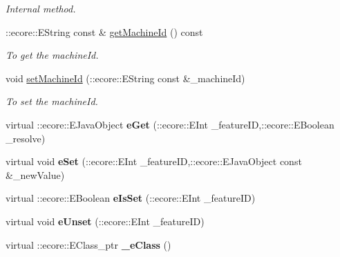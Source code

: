 \begin{DoxyCompactItemize}
\begin{DoxyCompactList}\small\item\em Internal method. \item\end{DoxyCompactList}\item 
::ecore::EString const \& \hyperlink{classIMS__Data_1_1SysInfoOp_aa991816c73b4fbffe99489ba8f5d7d8b}{getMachineId} () const 
\begin{DoxyCompactList}\small\item\em To get the machineId. \item\end{DoxyCompactList}\item 
void \hyperlink{classIMS__Data_1_1SysInfoOp_ab054bec834cea4b57eef465e190f3274}{setMachineId} (::ecore::EString const \&\_\-machineId)
\begin{DoxyCompactList}\small\item\em To set the machineId. \item\end{DoxyCompactList}\item 
\hypertarget{classIMS__Data_1_1SysInfoOp_a2e04f7fb0f37f65d2b4fd9b9a34769d4}{
virtual ::ecore::EJavaObject {\bfseries eGet} (::ecore::EInt \_\-featureID,::ecore::EBoolean \_\-resolve)}
\label{classIMS__Data_1_1SysInfoOp_a2e04f7fb0f37f65d2b4fd9b9a34769d4}

\item 
\hypertarget{classIMS__Data_1_1SysInfoOp_ac2531d0434f45c4c7d58816a30035633}{
virtual void {\bfseries eSet} (::ecore::EInt \_\-featureID,::ecore::EJavaObject const \&\_\-newValue)}
\label{classIMS__Data_1_1SysInfoOp_ac2531d0434f45c4c7d58816a30035633}

\item 
\hypertarget{classIMS__Data_1_1SysInfoOp_af50b867d5d835f1466bc49092165682c}{
virtual ::ecore::EBoolean {\bfseries eIsSet} (::ecore::EInt \_\-featureID)}
\label{classIMS__Data_1_1SysInfoOp_af50b867d5d835f1466bc49092165682c}

\item 
\hypertarget{classIMS__Data_1_1SysInfoOp_a42a9e473c302f1472c1788fa0b8bada2}{
virtual void {\bfseries eUnset} (::ecore::EInt \_\-featureID)}
\label{classIMS__Data_1_1SysInfoOp_a42a9e473c302f1472c1788fa0b8bada2}

\item 
\hypertarget{classIMS__Data_1_1SysInfoOp_a99cdbc37f72465564cdf8204d5c6567b}{
virtual ::ecore::EClass\_\-ptr {\bfseries \_\-eClass} ()}
\label{classIMS__Data_1_1SysInfoOp_a99cdbc37f72465564cdf8204d5c6567b}

\end{DoxyCompactItemize}
